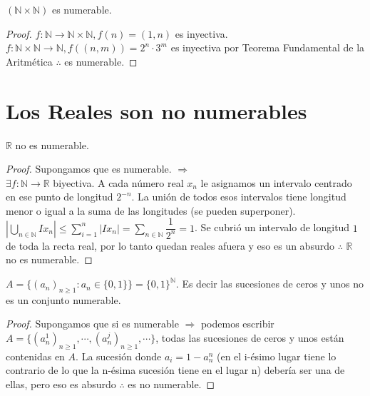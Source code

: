 \begin{eg}
    $(\mathbb{N} \times \mathbb{N})$ es numerable. 
    \begin{proof}
        $f: \mathbb{N} \to \mathbb{N}\times \mathbb{N}, f(n)=(1, n)$ es inyectiva.
        $f: \mathbb{N}\times \mathbb{N} \to \mathbb{N} , f((n, m))= 2^n \cdot 3^m$ es inyectiva por Teorema Fundamental de la Aritmética $\therefore$ es numerable. 
    \end{proof}
\end{eg}

\section{Los Reales son no numerables}

\begin{theorem}
    $\mathbb{R}$  no es numerable.
    \begin{proof}
        Supongamos que es numerable. $\Rightarrow$ \\
        $\exists f: \mathbb{N} \to \mathbb{R}$ biyectiva. A cada número real $x_n$ le asignamos un intervalo centrado en ese punto de longitud $2^{-n}$. La unión de todos esos intervalos tiene longitud menor o igual a la suma de las longitudes (se pueden superponer). \\
        
        $|\bigcup_{n\in\mathbb{N}} Ix_n| \leq \sum_{i=1}^{n} |Ix_n| = \sum_{n \in \mathbb{N}}\dfrac{1}{2^n} = 1 $. Se cubrió un intervalo de longitud $1$ de toda la recta real, por lo tanto quedan reales afuera y eso es un absurdo $\therefore$ $\mathbb{R}$ no es numerable.
    \end{proof}
\end{theorem}

\begin{eg}
    $A = \{ (a_n)_{n \geq 1} : a_n \in \{0, 1\}\} = \{0, 1\}^{\mathbb{N}}$. Es decir las sucesiones de ceros y unos no es un conjunto numerable.
    \begin{proof}
        Supongamos que si es numerable $\Rightarrow$ podemos escribir \\ $A = \{ (a_n^1)_{n\geq1}, \cdots, (a_n^j)_{n\geq1}, \cdots \}$, todas las sucesiones de ceros y unos están contenidas en $A$. La sucesión donde $a_i=1-a_n^n$ (en el i-ésimo lugar tiene lo contrario de lo que la n-ésima sucesión tiene en el lugar n) debería ser una de ellas, pero eso es absurdo $\therefore$ es no numerable.
    \end{proof}
\end{eg}

